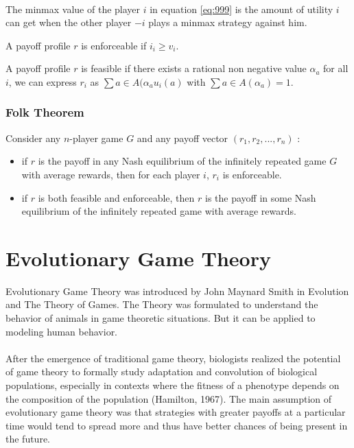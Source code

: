 \paragraph{} The minmax value of the player $i$ in equation \ref{eq:999} is the amount of utility $i$ can get when the other player $-i$ plays a minmax strategy against him.
\begin{mydef}[Enforceability]\label{def:def100}
A payoff profile $r$ is enforceable if $i_i \geq v_i$.
\end{mydef}
\begin{mydef}[Feasibility]\label{def:def100}
A payoff profile $r$ is feasible if there exists a rational non negative value $\alpha_a$ for all $i$, we can express $r_i$ as $\sum{a \in A}(\alpha_a u_i(a)$ with $\sum{a \in A}(\alpha_a) = 1$.
\end{mydef}
\subsubsection{Folk Theorem}
Consider any $n$-player game $G$ and any payoff vector $(r_1, r_2, ...,r_n) $ :
\begin{itemize}
\item if $r$ is the payoff in any Nash equilibrium of the infinitely repeated game $G$ with average rewards, then for each player $i$,  $r_i$ is enforceable.
\item if $r$ is both feasible and enforceable, then $r$ is the payoff in some Nash equilibrium of the infinitely repeated game with average rewards.
\end{itemize}
\section{Evolutionary Game Theory}

Evolutionary Game Theory was introduced by John Maynard Smith in Evolution and The Theory of Games. The Theory was formulated to understand the behavior of animals in game theoretic situations. But it can be applied to modeling human behavior.

\paragraph{}After the emergence of traditional game theory, biologists realized the potential of game theory to formally study adaptation and convolution of biological populations, especially in contexts where the fitness of a phenotype depends on the composition of the population (Hamilton, 1967). The main assumption of evolutionary game theory was that strategies with greater payoffs at a particular time would tend to spread more and thus have better chances of being present in the future.
